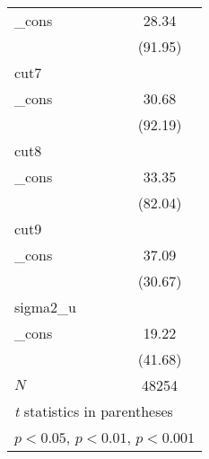 {\begin{tabular}{l*{1}{c}}
\_cons      &       28.34\sym{***}\\
            &     (91.95)         \\
\hline
cut7        &                     \\
\_cons      &       30.68\sym{***}\\
            &     (92.19)         \\
\hline
cut8        &                     \\
\_cons      &       33.35\sym{***}\\
            &     (82.04)         \\
\hline
cut9        &                     \\
\_cons      &       37.09\sym{***}\\
            &     (30.67)         \\
\hline
sigma2\_u    &                     \\
\_cons      &       19.22\sym{***}\\
            &     (41.68)         \\
\hline
\(N\)       &       48254         \\
\hline\hline
\multicolumn{2}{l}{\footnotesize \textit{t} statistics in parentheses}\\
\multicolumn{2}{l}{\footnotesize \sym{*} \(p<0.05\), \sym{**} \(p<0.01\), \sym{***} \(p<0.001\)}\\
\end{tabular}
}
